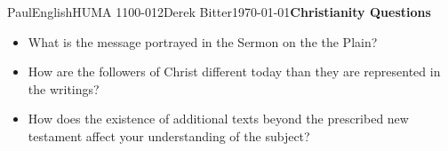 \documentclass[12pt,letterpaper]{article}
\begin{document}
\begin{mla}{Paul}{English}{HUMA 1100-012}{Derek
    Bitter}{\today}{\textbf{Christianity Questions}}

\begin{itemize}

\item What is the message portrayed in the Sermon on the the Plain?

\item How are the followers of Christ different today than they are
  represented in the writings?

\item How does the existence of additional texts beyond the prescribed
  new testament affect your understanding of the subject?

\end{itemize}




\end{mla}
\end{document}
